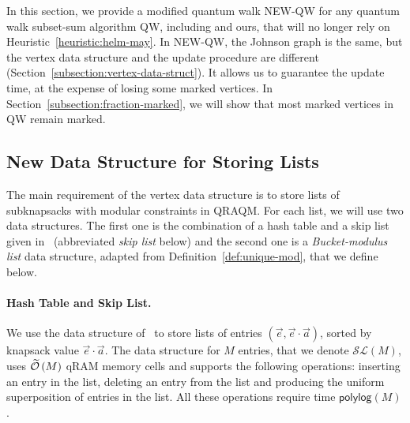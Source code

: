 In this section, we provide a modified quantum walk \textsc{NEW-QW} for any quantum walk subset-sum algorithm \textsc{QW}, including \cite{DBLP:conf/pqcrypto/BernsteinJLM13,DBLP:conf/tqc/HelmM18} and ours, that will no longer rely on Heuristic~\ref{heuristic:helm-may}. In \textsc{NEW-QW}, the Johnson graph is the same, but the vertex data structure and the update procedure are different (Section~\ref{subsection:vertex-data-struct}). It allows us to guarantee the update time, at the expense of losing some marked vertices. In Section~\ref{subsection:fraction-marked}, we will show that most marked vertices in \textsc{QW} remain marked.


\subsection{New Data Structure for Storing Lists}\label{subsection:new-data-struct}

The main requirement of the vertex data structure is to store lists of subknapsacks with modular constraints in QRAQM. For each list, we will use two data structures. The first one is the combination of a hash table and a skip list given in~\cite{DBLP:journals/siamcomp/Ambainis07} (abbreviated \emph{skip list} below) and the second one is a \emph{Bucket-modulus list} data structure, adapted from Definition~\ref{def:unique-mod}, that we define below.

\paragraph{Hash Table and Skip List.}
We use the data structure of~\cite{DBLP:journals/siamcomp/Ambainis07} to store lists of entries $(\vec{e}, \vec{e} \cdot \vec{a})$, sorted by knapsack value $\vec{e} \cdot \vec{a}$. The data structure for $M$ entries, that we denote $\mathcal{SL}(M)$, uses $\widetilde{\mathcal{O}} \left(M \right)$ qRAM memory cells and supports the following operations: inserting an entry in the list, deleting an entry from the list and producing the uniform superposition of entries in the list. All these operations require time $\mathsf{polylog}(M)$.

